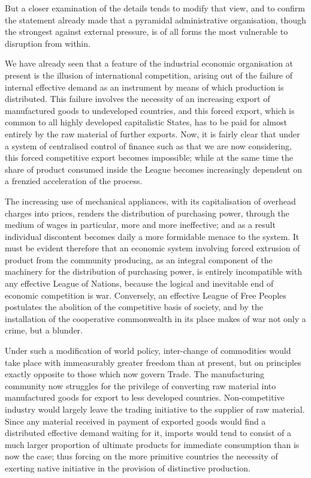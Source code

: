 \documentclass{book}
\begin{document}
But a closer examination of the details tends to modify that view, and to confirm the statement already made that a pyramidal administrative organisation, though the strongest against external pressure, is of all forms the most vulnerable to disruption from within.

We have already seen that a feature of the industrial economic organisation at present is the illusion of international competition, arising out of the failure of internal effective demand as an instrument by means of which production is distributed. This failure involves the necessity of an increasing export of manufactured goods to undeveloped countries, and this forced export, which is common to all highly developed capitalistic States, has to be paid for almost entirely by the raw material of further exports. Now, it is fairly clear that under a system of centralised control of finance such as that we are now considering, this forced competitive export becomes impossible; while at the same time the share of product consumed inside the League becomes increasingly dependent on a frenzied acceleration of the process.

The increasing use of mechanical appliances, with its capitalisation of overhead charges into prices, renders the distribution of purchasing power, through the medium of wages in particular, more and more ineffective; and as a result individual discontent becomes daily a more formidable menace to the system. It must be evident therefore that an economic system involving forced extrusion of product from the community producing, as an integral component of the machinery for the distribution of purchasing power, is entirely incompatible with any effective League of Nations, because the logical and inevitable end of economic competition is war. Conversely, an effective League of Free Peoples postulates the abolition of the competitive basis of society, and by the installation of the cooperative commonwealth in its place makes of war not only a crime, but a blunder.

Under such a modification of world policy, inter-change of commodities would take place with immeasurably greater freedom than at present, but on principles exactly opposite to those which now govern Trade. The manufacturing community now struggles for the privilege of converting raw material into manufactured goods for export to less developed countries. Non-competitive industry would largely leave the trading initiative to the supplier of raw material. Since any material received in payment of exported goods would find a distributed effective demand waiting for it, imports would tend to consist of a much larger proportion of ultimate products for immediate consumption than is now the case; thus forcing on the more primitive countries the necessity of exerting native initiative in the provision of distinctive production.
\end{document}
